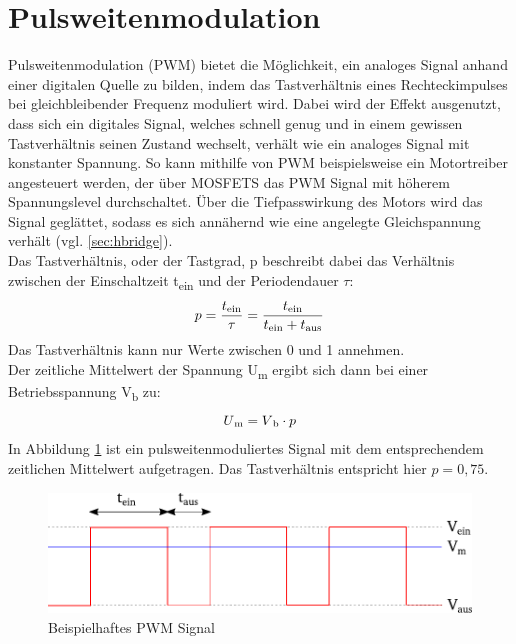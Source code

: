 \section{Pulsweitenmodulation}
Pulsweitenmodulation (PWM) bietet die Möglichkeit, ein analoges Signal anhand einer digitalen Quelle zu bilden, indem das Tastverhältnis eines Rechteckimpulses bei gleichbleibender Frequenz moduliert wird. Dabei wird der Effekt ausgenutzt, dass sich ein digitales Signal, welches schnell genug und in einem gewissen Tastverhältnis seinen Zustand wechselt, verhält wie ein analoges Signal mit konstanter Spannung. So kann mithilfe von PWM beispielsweise ein Motortreiber angesteuert werden, der über MOSFETS das PWM Signal mit höherem Spannungslevel durchschaltet. Über die Tiefpasswirkung des Motors wird das Signal geglättet, sodass es sich annähernd wie eine angelegte Gleichspannung verhält (vgl. \autoref{sec:hbridge}).\\
Das Tastverhältnis, oder der Tastgrad, p beschreibt dabei das Verhältnis zwischen der Einschaltzeit t\textsubscript{ein} und der Periodendauer $\tau$:
\begin{equation}
	p=\frac{t\textsubscript{ein}}{\tau} = \frac{t\textsubscript{ein}}{t\textsubscript{ein}+t\textsubscript{aus}}
\end{equation}
Das Tastverhältnis kann nur Werte zwischen 0 und 1 annehmen.\\
Der zeitliche Mittelwert der Spannung U\textsubscript{m} ergibt sich dann bei einer Betriebsspannung V\textsubscript{b} zu:
\begin{equation}
	U\textsubscript{m}=V\textsubscript{b}\cdot p
\end{equation}
In Abbildung \ref{fig:PWM} ist ein pulsweitenmoduliertes Signal mit dem entsprechendem zeitlichen Mittelwert aufgetragen. Das Tastverhältnis entspricht hier $p=0,75$.
\begin{figure}[H]
	\centering
		\includegraphics[width=0.6\columnwidth]{Bilder/PWM.pdf}
	\caption{Beispielhaftes PWM Signal}
	\label{fig:PWM}
\end{figure} \noindent

